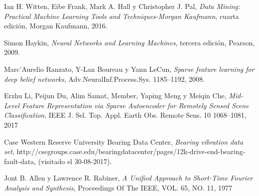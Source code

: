 \documentclass[12pt]{article}%
\begin{document}
\begin{thebibliography}{9}
Ian H. Witten, Eibe Frank, Mark A. Hall y Christopher J. Pal, \textit{Data Mining: Practical Machine Learning Tools and Techniques-Morgan Kaufmann}, cuarta edición, Morgan Kaufmann, 2016.

Simon Haykin, \textit{Neural Networks and Learning Machines}, tercera edición, Pearson, 2009.

Marc’Aurelio Ranzato, Y-Lan Boureau y Yann LeCun, \textit{Sparse feature learning for deep belief networks}, Adv.NeuralInf.Process.Sys. 1185–1192, 2008.

Erzhu Li, Peijun Du, Alim Samat, Member, Yaping Meng y Meiqin Che, \textit{Mid-Level Feature Representation via Sparse Autoencoder for Remotely Sensed Scene Classification}, IEEE J. Sel. Top. Appl. Earth Obs. Remote Sens. 10 1068–1081, 2017

Case Western Reserve University Bearing Data Center, \textit{Bearing vibration data set}, http://csegroups.case.edu/bearingdatacenter/pages/12k-drive-end-bearing-fault-data, (visitado el 30-08-2017).

Jont B. Allen y Lawrence R. Rabiner, \textit{A Unified Approach to Short-Time Fourier Analysis
and Synthesis}, Proceedings Of The IEEE, VOL. 65, NO. 11, 1977



\end{thebibliography}
\end{document}
